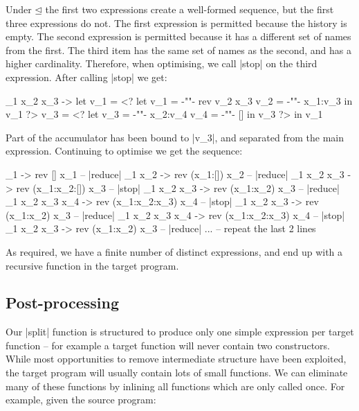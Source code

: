 \documentclass[draft]{sigplanconf}
\begin{document}
Under $\unlhd$ the first two expressions create a well-formed sequence, but the first three expressions do not. The first expression is permitted because the history is empty. The second expression is permitted because it has a different set of names from the first. The third item has the same set of names as the second, and has a higher cardinality. Therefore, when optimising, we call |stop| on the third expression. After calling |stop| we get:

\begin{code}
\x_1 x_2 x_3 ->
    let  v_1 = <?  let  v_1  = {-""-}   rev v_2 x_3
                        v_2  = {-""-}   x_1:v_3
                   in   v_1 ?>
         v_3 = <?  let  v_3  = {-""-}   x_2:v_4
                        v_4  = {-""-}  []
                   in   v_3 ?>
    in   v_1
\end{code}

Part of the accumulator has been bound to |v_3|, and separated from the main expression. Continuing to optimise we get the sequence:

\begin{code}
\x_1 -> rev [] x_1                          -- |reduce|
\x_1 x_2 -> rev (x_1:[]) x_2                -- |reduce|
\x_1 x_2 x_3 -> rev (x_1:x_2:[]) x_3        -- |stop|
\x_1 x_2 x_3 -> rev (x_1:x_2) x_3           -- |reduce|
\x_1 x_2 x_3 x_4 -> rev (x_1:x_2:x_3) x_4   -- |stop|
\x_1 x_2 x_3 -> rev (x_1:x_2) x_3           -- |reduce|
\x_1 x_2 x_3 x_4 -> rev (x_1:x_2:x_3) x_4   -- |stop|
\x_1 x_2 x_3 -> rev (x_1:x_2) x_3           -- |reduce|
... -- repeat the last 2 lines
\end{code}

As required, we have a finite number of distinct expressions, and end up with a recursive function in the target program.

\subsection{Post-processing}
\label{sec:postprocess}

Our |split| function is structured to produce only one simple expression per target function -- for example a target function will never contain two constructors. While most opportunities to remove intermediate structure have been exploited, the target program will usually contain lots of small functions. We can eliminate many of these functions by inlining all functions which are only called once. For example, given the source program:
\end{document}
